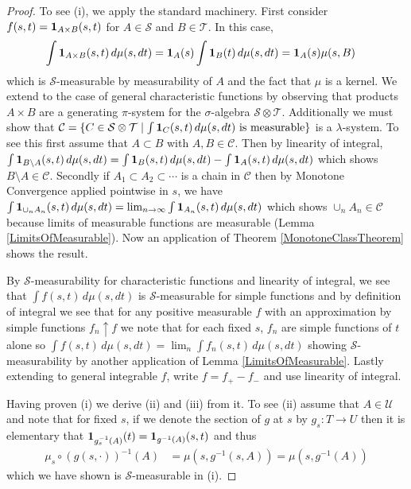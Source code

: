 \begin{proof}
To see (i), we apply the standard machinery.  First consider $f(s,t) = \textbf{1}_{A\times B}(s,t)$
for $A \in \mathcal{S}$ and $B \in \mathcal{T}$.  In this case, 
\begin{align*}
\int \textbf{1}_{A \times B} (s, t) \, d\mu(s,dt) &=
\textbf{1}_{A} (s)\int \textbf{1}_{B} (t) \, d\mu(s,dt)
=\textbf{1}_{A} (s) \mu(s,B)
\end{align*}
which is $\mathcal{S}$-measurable by measurability of $A$ and the fact
that $\mu$ is a kernel.  We extend to the case of general characteristic
functions by observing that products $A \times B$ are a generating
$\pi$-system for the $\sigma$-algebra $\mathcal{S} \otimes
\mathcal{T}$.  Additionally we must show that $\mathcal{C} = \lbrace C
\in \mathcal{S} \otimes \mathcal{T} \mid \int \textbf{1}_{C} (s, t) \, d\mu(s,dt) \text { is measurable} \rbrace$ is a
$\lambda$-system.  To see this first assume that $A \subset B$ with
$A,B \in \mathcal{C}$.  Then by linearity of integral, $\int
\textbf{1}_{B \setminus A} (s, t) \, d\mu(s,dt) = \int
\textbf{1}_{B} (s, t) \, d\mu(s,dt) - \int
\textbf{1}_{A} (s, t) \, d\mu(s,dt)$ which shows $B \setminus A \in
\mathcal{C}$.  Secondly if $A_1 \subset A_2 \subset \cdots$ is a chain
in $\mathcal{C}$ then by Monotone Convergence applied pointwise in
$s$, we have $\int \textbf{1}_{\cup_n A_n} (s, t) \, d\mu(s,dt) =
\lim_{n\to \infty} \int \textbf{1}_{A_n} (s, t) \, d\mu(s,dt)$
which shows $\cup_n A_n \in \mathcal{C}$ because limits of measurable functions are measurable
(Lemma \ref{LimitsOfMeasurable}).  Now an application of Theorem
\ref{MonotoneClassTheorem} shows the result.

By $\mathcal{S}$-measurability for characteristic functions and
linearity of integral, we see that $\int f (s, t) \, d\mu(s,dt)$ is
$\mathcal{S}$-measurable for simple functions and by definition of
integral we see that for any positive measurable $f$ with an
approximation by simple functions $f_n \uparrow f$ we note that for
each fixed $s$, $f_n$ are simple functions of $t$ alone so $\int f (s,
t) \, d\mu(s,dt) = \lim_{n} \int f_n (s,
t) \, d\mu(s,dt)$ showing $\mathcal{S}$-measurability by another
application of Lemma \ref{LimitsOfMeasurable}.  Lastly extending to
general integrable $f$, write $f = f_+ - f_-$ and use linearity of
integral.

Having proven (i) we derive (ii) and (iii) from it.  To see (ii)
assume that $A \in \mathcal{U}$ and note that for fixed $s$, if we
denote the section of $g$ at $s$ by $g_s : T \to U$ then it is
elementary that $\textbf{1}_{g_s^{-1}(A)}(t) =
\textbf{1}_{g^{-1}(A)}(s,t)$ and thus
\begin{align*}
\mu_s \circ (g(s, \cdot))^{-1}(A) &= \mu(s, g^{-1}(s, A)) = \mu(s, g^{-1}(A)) 
\end{align*}
which we have shown is $\mathcal{S}$-measurable in (i).


\end{proof}
